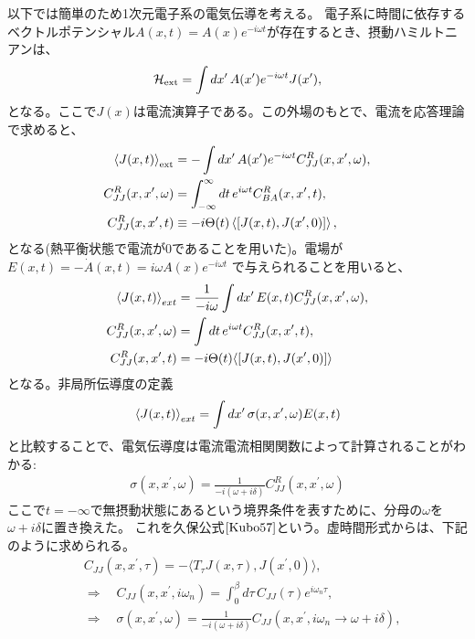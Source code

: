 \documentclass[10pt,a4j]{jarticle}
\begin{document}
以下では簡単のため1次元電子系の電気伝導を考える。
電子系に時間に依存するベクトルポテンシャル$A(x,t) = A(x)e^{-i\omega t}$が存在するとき、摂動ハミルトニアンは、
\begin{align}
\mathcal{H}_{\rm ext} = \int dx^\prime\, A(x^\prime) e^{- i\omega t} J(x^\prime),
\end{align}
となる。ここで$J(x)$は電流演算子である。この外場のもとで、電流を応答理論で求めると、
\begin{align}
\braket{J(x,t)}_{\rm ext} &= - \int dx^\prime \, A(x^\prime) e^{-i\omega t} C^{R}_{JJ}(x,x^\prime,\omega) , \\
C^{R}_{JJ}(x,x^\prime,\omega) &= \int^{\infty}_{-\infty} dt \, e^{i\omega t} C^{R}_{BA}(x,x^\prime,t), \\
C^{R}_{JJ}(x,x^\prime,t) &\equiv -i \Theta (t) \braket{ [J(x,t),J(x^\prime,0) ]} ,
\end{align}
となる(熱平衡状態で電流が0であることを用いた)。電場が$E(x,t) = -\dot{A}(x,t) = i \omega A(x)e^{-i\omega t}$
で与えられることを用いると、
\begin{align}
\braket{J(x,t)}_{ext} &= \frac{1}{-i\omega} \int dx^\prime \, E(x,t) C^{R}_{JJ}(x,x^\prime,\omega), \\
C^{R}_{JJ}(x,x^\prime,\omega) &= \int dt \, e^{i\omega t}C^{R}_{JJ}(x,x^\prime,t), \\
C^{R}_{JJ}(x,x^\prime,t) &= - i\Theta(t) \langle [ J(x,t), J(x^\prime,0) ] \rangle
\end{align}
となる。非局所伝導度の定義
\begin{align}
\braket{J(x,t)}_{ext} = \int dx^\prime \, \sigma(x,x^\prime,\omega) E(x,t)  
\end{align}
と比較することで、電気伝導度は電流電流相関関数によって計算されることがわかる:
\begin{align}
\sigma(x,x^\prime,\omega) = \frac{1}{-i(\omega+i\delta)} C^R_{JJ}(x,x^\prime,\omega)
\end{align}
ここで$t=-\infty$で無摂動状態にあるという境界条件を表すために、分母の$\omega$を
$\omega + i\delta$に置き換えた。
これを久保公式$\cite{Kubo57}$という。虚時間形式からは、下記のように求められる。
\begin{align}
& C_{JJ}(x,x^\prime,\tau) =  - \langle T_\tau J(x,\tau), J(x^\prime,0) \rangle, \\
& \Longrightarrow \quad C_{JJ}(x,x^\prime,i\omega_n) = \int_0^{\beta} d\tau \, C_{JJ}(\tau) e^{i\omega_n \tau} , \\
& \Longrightarrow \quad \sigma(x,x^\prime,\omega) = 
\frac{1}{-i(\omega+i\delta)} C_{JJ}(x,x^\prime, i\omega_n \rightarrow \omega + i\delta), 
\end{align}
\end{document}
